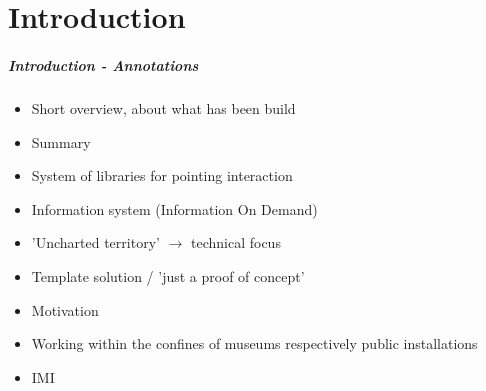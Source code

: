 \chapter{Introduction}
\label{introduction}

%
%

\paragraph{Introduction - Annotations}

\begin{itemize}
	\item Short overview, about what has been build
	\item Summary
	\\
	\item System of libraries for pointing interaction
	\item Information system (Information On Demand)
	\item 'Uncharted territory' $\to$ technical focus
	\item Template solution / 'just a proof of concept'
  \\
	\item Motivation
	\item Working within the confines of museums respectively public installations
	\\
	\item \ac{IMI} %
\end{itemize}

